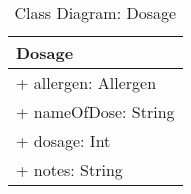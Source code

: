 \begin{table}[H]
\centering
\caption{Class Diagram: Dosage}

\hspace{1em}
\renewcommand{\arraystretch}{1.7}

\begin{tabular}{|l|}
\hline
\textbf{Dosage} \\
\hline
+ allergen: Allergen \\
+ nameOfDose: String \\
+ dosage: Int \\
+ notes: String \\
\hline
\end{tabular}
\end{table}
